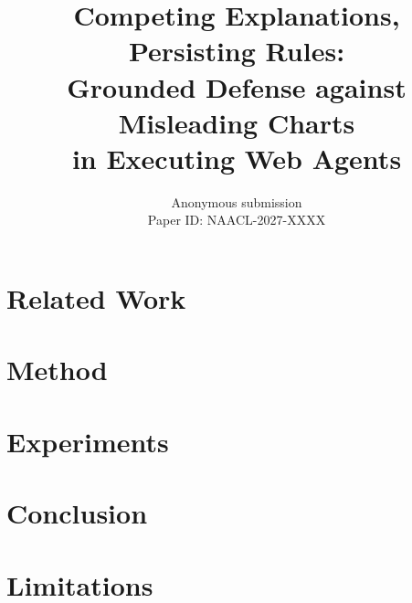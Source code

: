 \documentclass[11pt,a4paper]{article}
\title{Competing Explanations, Persisting Rules:\\
Grounded Defense against Misleading Charts\\
in Executing Web Agents}
\author{Anonymous submission\\
Paper ID: NAACL-2027-XXXX}
\begin{document}
\maketitle

\begin{abstract}

\end{abstract}



\section{Related Work}\label{sec:related}


\FloatBarrier
\section{Method}\label{sec:method}


\FloatBarrier
\section{Experiments}\label{sec:experiments}


\FloatBarrier
\section{Conclusion}\label{sec:conclusion}


\section*{Limitations}\label{sec:limitations}




\appendix

\end{document}
